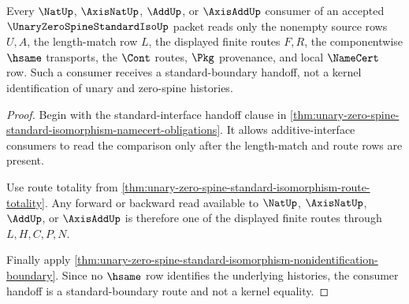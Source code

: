 \begin{theorem}
\label{thm:unary-zero-spine-standard-isomorphism-axis-nat-handoff}
Every $\NatUp$, $\AxisNatUp$, $\AddUp$, or $\AxisAddUp$ consumer of an accepted $\UnaryZeroSpineStandardIsoUp$ packet reads only the nonempty source rows $U,A$, the length-match row $L$, the displayed finite routes $F,R$, the componentwise $\hsame$ transports, the $\Cont$ routes, $\Pkg$ provenance, and local $\NameCert$ row. Such a consumer receives a standard-boundary handoff, not a kernel identification of unary and zero-spine histories.
\end{theorem}
\begin{proof}
Begin with the standard-interface handoff clause in \autoref{thm:unary-zero-spine-standard-isomorphism-namecert-obligations}. It allows additive-interface consumers to read the comparison only after the length-match and route rows are present.

Use route totality from \autoref{thm:unary-zero-spine-standard-isomorphism-route-totality}. Any forward or backward read available to $\NatUp$, $\AxisNatUp$, $\AddUp$, or $\AxisAddUp$ is therefore one of the displayed finite routes through $L,H,C,P,N$.

Finally apply \autoref{thm:unary-zero-spine-standard-isomorphism-nonidentification-boundary}. Since no $\hsame$ row identifies the underlying histories, the consumer handoff is a standard-boundary route and not a kernel equality.
\end{proof}

